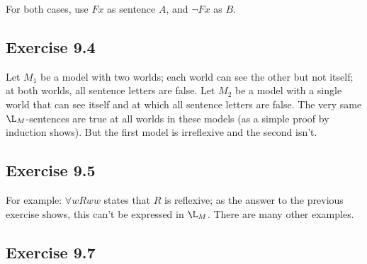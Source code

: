 \documentclass{scrartcl}
\begin{document}
%
%
  For both cases, use $Fx$ as sentence $A$, and $\neg Fx$ as $B$.

  \subsection*{Exercise 9.4}

%
%
  Let $M_1$ be a model with two worlds; each world can see the other but not
  itself; at both worlds, all sentence letters are false. Let $M_2$ be a model
  with a single world that can see itself and at which all sentence letters are
  false. The very same $\L_M$-sentences are true at all worlds in these models
  (as a simple proof by induction shows). But the first model is irreflexive and
  the second isn't.

  \subsection*{Exercise 9.5}

%
%
  For example: $\forall w Rww$ states that $R$ is reflexive; as the answer to
  the previous exercise shows, this can't be expressed in $\L_M$. There are many
  other examples.

  \subsection*{Exercise 9.7}
\end{document}
